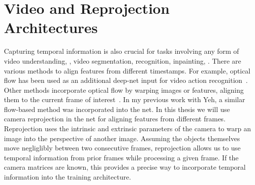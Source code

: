 \section{Video and Reprojection Architectures}
Capturing temporal information is also crucial for tasks involving any form of video understanding, \eg, video segmentation, recognition, inpainting, \etc. There are various methods to align features from different timestamps. For example, optical flow has been used as an additional deep-net input for video action recognition~\cite{simonyan2014two, singh2016first}. Other methods incorporate optical flow by warping images or features, aligning them to the current frame of interest~\cite{hu2017maskrnn,gadde2017semantic, kim2019deep}. In my previous work with Yeh, a similar flow-based method was incorporated into the net. In this thesis we will use camera reprojection in the net for aligning features from different frames. Reprojection uses the intrinsic and extrinsic parameters of the camera to warp an image into the perspective of another image. Assuming the objects themselves move negliglibly between two consecutive frames, reprojection allows us to use temporal information from prior frames while processing a given frame. If the camera matrices are known, this provides a precise way to incorporate temporal information into the training architecture.
